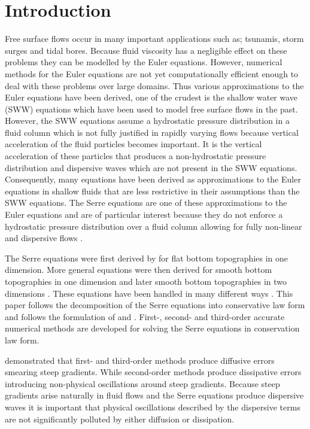 \documentclass[SingleSpace,12pt,Proceedings]{Serre_ASCE}
\begin{document}
\section{Introduction} \label{intro}
Free surface flows occur in many important applications such as; tsunamis, storm surges and tidal bores. Because fluid viscosity has a negligible effect on these problems they can be modelled by the Euler equations. However, numerical methods for the Euler equations are not yet computationally efficient enough to deal with these problems over large domains. Thus various approximations to the Euler equations have been derived,  one of the crudest is the shallow water wave (SWW) equations which have been used to model free surface flows in the past. However, the SWW equations assume a hydrostatic pressure distribution in a fluid column which is not fully justified in rapidly varying flows because vertical acceleration of the fluid particles becomes important. It is the vertical acceleration of these particles that produces a non-hydrostatic pressure distribution and dispersive waves which are not present in the SWW equations. Consequently, many equations have been derived as approximations to the Euler equations in shallow fluids that are less restrictive in their assumptions than the SWW equations. The Serre equations are one of these approximations to the Euler equations and are of particular interest because they do not enforce a hydrostatic pressure distribution over a fluid column allowing for fully non-linear and dispersive flows \cite{Bonneton-Lannes-2009-16601}. 

The Serre equations were first derived by  for flat bottom topographies in one dimension. More general equations were then derived for smooth bottom topographies in one dimension \cite{Su-Gardener-1969-536} and later smooth bottom topographies in two dimensions \cite{Green-Naghdi-1976-237}. These equations have been handled in many different ways \cite{Dutykh-2014-315,Bonneton-etal-2011-1479,Antunes-do-Carmo-etal-1993-725,Chazel-etal-2011-105,Barthelemy-2006-51-1217,Barthelemy-2007-53-1423,Clamond-2011-315}. This paper follows the decomposition of the Serre equations into conservative law form \cite{Hank-etal-2010-2034,Guyenne-etal-2014-169,Zoppou-2014} and follows the formulation of  and . First-, second- and third-order accurate numerical methods are developed for solving the Serre equations in conservation law form. 

 demonstrated that first- and third-order methods produce diffusive errors smearing steep gradients. While second-order methods produce dissipative errors introducing non-physical oscillations around steep gradients. Because steep gradients arise naturally in fluid flows and the Serre equations produce dispersive waves \cite{El-etal-2006} it is important that physical oscillations described by the dispersive terms are not significantly polluted by either diffusion or dissipation.
\end{document}
